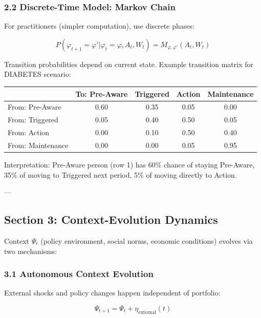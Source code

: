 \subsubsection*{2.2 Discrete-Time Model: Markov Chain}

For practitioners (simpler computation), use discrete phases:

\begin{equation}
P(\varphi_{t+1} = \varphi' | \varphi_t = \varphi, A_t, W_t) = M_{\varphi, \varphi'}(A_t, W_t)
\label{eq:kkk-phase-markov}
\end{equation}

Transition probabilities depend on current state. Example transition matrix for DIABETES scenario:

\begin{center}
\begin{tabular}{l|cccc}
 & To: Pre-Aware & Triggered & Action & Maintenance \\
\hline
From: Pre-Aware & 0.60 & 0.35 & 0.05 & 0.00 \\
From: Triggered & 0.05 & 0.40 & 0.50 & 0.05 \\
From: Action & 0.00 & 0.10 & 0.50 & 0.40 \\
From: Maintenance & 0.00 & 0.00 & 0.05 & 0.95 \\
\end{tabular}
\end{center}

Interpretation: Pre-Aware person (row 1) has 60\% chance of staying Pre-Aware, 35\% of moving to Triggered next period, 5\% of moving directly to Action.

---

\subsection*{Section 3: Context-Evolution Dynamics}
\label{sec:kkk-context-dynamics}

Context $\Psi_t$ (policy environment, social norms, economic conditions) evolves via two mechanisms:

\subsubsection*{3.1 Autonomous Context Evolution}

External shocks and policy changes happen independent of portfolio:

\begin{equation}
\Psi_{t+1} = \Psi_t + \eta_{\text{external}}(t)
\label{eq:kkk-context-external}
\end{equation}

